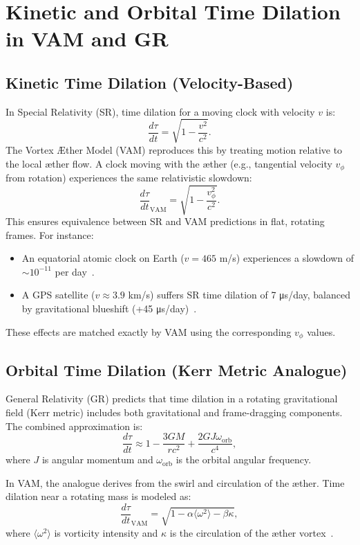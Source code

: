 \section{Kinetic and Orbital Time Dilation in VAM and GR}

\subsection{Kinetic Time Dilation (Velocity-Based)}

In Special Relativity (SR), time dilation for a moving clock with velocity $v$ is:
\[
    \frac{d\tau}{dt} = \sqrt{1 - \frac{v^2}{c^2}}.
\]
The Vortex Æther Model (VAM) reproduces this by treating motion relative to the local æther flow. A clock moving with the æther (e.g., tangential velocity $v_\phi$ from rotation) experiences the same relativistic slowdown:
\[
    \frac{d\tau}{dt}_\text{VAM} = \sqrt{1 - \frac{v_\phi^2}{c^2}}.
\]
This ensures equivalence between SR and VAM predictions in flat, rotating frames. For instance:
\begin{itemize}
    \item An equatorial atomic clock on Earth ($v=465$ m/s) experiences a slowdown of $\sim 10^{-11}$ per day~\cite{ashby2003relativity}.
    \item A GPS satellite ($v \approx 3.9$ km/s) suffers SR time dilation of 7 μs/day, balanced by gravitational blueshift (+45 μs/day)~\cite{ashby2003relativity}.
\end{itemize}
These effects are matched exactly by VAM using the corresponding $v_\phi$ values.

\subsection{Orbital Time Dilation (Kerr Metric Analogue)}

General Relativity (GR) predicts that time dilation in a rotating gravitational field (Kerr metric) includes both gravitational and frame-dragging components. The combined approximation is:
\[
    \frac{d\tau}{dt} \approx 1 - \frac{3GM}{rc^2} + \frac{2GJ\omega_\text{orb}}{c^4},
\]
where $J$ is angular momentum and $\omega_\text{orb}$ is the orbital angular frequency.

In VAM, the analogue derives from the swirl and circulation of the æther. Time dilation near a rotating mass is modeled as:
\[
    \frac{d\tau}{dt}_\text{VAM} = \sqrt{1 - \alpha \langle \omega^2 \rangle - \beta \kappa},
\]
where $\langle \omega^2 \rangle$ is vorticity intensity and $\kappa$ is the circulation of the æther vortex~\cite{iskandarani2025VAM2}.


